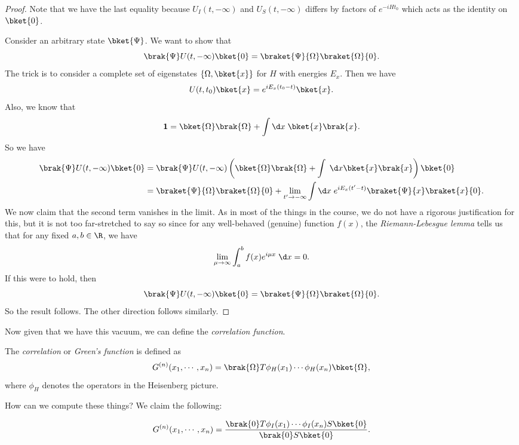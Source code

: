 \documentclass[a4paper]{article}
\begin{document}
\begin{proof}
  Note that we have the last equality because $U_I(t, -\infty)$ and $U_S(t, -\infty)$ differs by factors of $e^{-iH t_0}$ which acts as the identity on $\bket{0}$. %

  Consider an arbitrary state $\bket{\Psi}$. We want to show that
  \[
    \brak{\Psi}U(t, -\infty)\bket{0} = \braket{\Psi}{\Omega}\braket{\Omega}{0}.
  \]
  The trick is to consider a complete set of eigenstates $\{\Omega, \bket{x}\}$ for $H$ with energies $E_x$. Then we have
  \[
    U(t, t_0) \bket{x} = e^{iE_x(t_0 - t)} \bket{x}.
  \]
  Also, we know that
  \[
    \mathbf{1} = \bket{\Omega}\brak{\Omega} + \int \d x\; \bket{x}\brak{x}.
  \]
  So we have
  \begin{align*}
    \brak{\Psi}U(t, -\infty) \bket{0} &= \brak{\Psi}U(t, -\infty) \left(\bket{\Omega}\brak{\Omega} + \int \;\d x \bket{x}\brak{x}\right)\bket{0}\\
    &= \braket{\Psi}{\Omega} \braket{\Omega}{0} + \lim_{t' \to -\infty} \int\d x\; e^{iE_x(t' - t)} \braket{\Psi}{x} \braket{x}{0}.
  \end{align*}
  We now claim that the second term vanishes in the limit. As in most of the things in the course, we do not have a rigorous justification for this, but it is not too far-stretched to say so since for any well-behaved (genuine) function $f(x)$, the \emph{Riemann-Lebesgue lemma} tells us that for any fixed $a, b \in \R$, we have
  \[
    \lim_{\mu \to \infty} \int_a^b f(x) e^{i\mu x}\;\d x = 0.
  \]
  If this were to hold, then
  \[
    \brak{\Psi}U(t, -\infty)\bket{0} = \braket{\Psi}{\Omega}\braket{\Omega}{0}.
  \]
  So the result follows. The other direction follows similarly.
\end{proof}

Now given that we have this vacuum, we can define the \emph{correlation function}.
\begin{defi}
  The \emph{correlation} or \emph{Green's function} is defined as
  \[
    G^{(n)}(x_1, \cdots, x_n) = \brak{\Omega}T \phi_H(x_1) \cdots \phi_H(x_n)\bket{\Omega},
  \]
  where $\phi_H$ denotes the operators in the Heisenberg picture.
\end{defi}

How can we compute these things? We claim the following:
\begin{prop}
  \[
    G^{(n)}(x_1, \cdots, x_n) = \frac{\brak{0}T \phi_I(x_1) \cdots \phi_I(x_n)S \bket{0}}{\brak{0}S\bket{0}}.
  \]
\end{prop}
\end{document}

